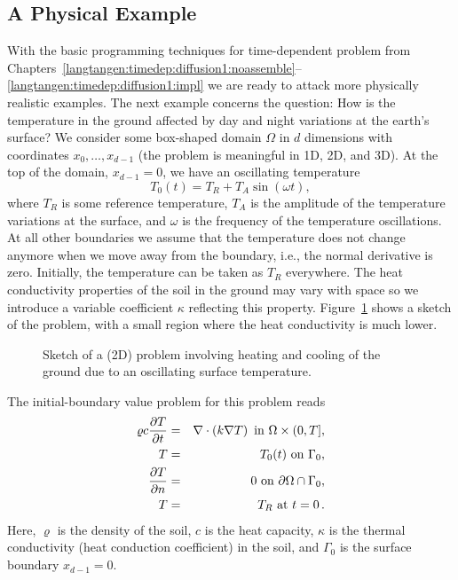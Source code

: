 \subsection{A Physical Example}
\label{langtangen:timedep:diffusion2:sin}

With the basic programming techniques for time-dependent problem from 
Chapters~\ref{langtangen:timedep:diffusion1:noassemble}--\ref{langtangen:timedep:diffusion1:impl}
we are ready to attack more physically realistic examples.
The next example concerns the question: How is the temperature in the
ground affected by day and night variations at the earth's surface?
We consider some box-shaped domain $\Omega$ in $d$ dimensions with
coordinates $x_0,\ldots,x_{d-1}$ (the problem is meaningful in 1D, 2D, and 3D).
At the top of the domain, $x_{d-1}=0$, we have an oscillating
temperature
\[ T_0(t) = T_R + T_A\sin (\omega t),\]
where $T_R$ is some reference temperature, $T_A$ is the amplitude of
the temperature variations at the surface, and $\omega$ is the frequency
of the temperature oscillations.
At all other boundaries we assume
that the temperature does not change anymore when we move away from
the boundary, i.e., the normal derivative is zero.
Initially, the temperature can be taken as $T_R$ everywhere.
The heat conductivity properties of the soil in the 
ground may vary with space so
we introduce a variable coefficient $\kappa$ reflecting this property.
Figure~\ref{langtangen:timedep:diffusion2:sin:fig1} shows a sketch of the
problem, with a small region where the heat conductivity is much lower.
\begin{figure}
\centerline{
  }
  \caption{\label{langtangen:timedep:diffusion2:sin:fig1}
  Sketch of a (2D) problem involving heating and cooling of the ground due
  to an oscillating surface temperature.
  }
\end{figure}

The initial-boundary value problem for this problem reads
\begin{eqnarray}
\varrho c{\partial T\over\partial t} &=& \nabla\cdot\left( k\nabla T\right)\hbox{ in }\Omega\times (0,T],\\
T &=& T_0(t)\hbox{ on }\Gamma_0,\\
{\partial T\over\partial n} &=& 0\hbox{ on }\partial\Omega\cap\Gamma_0,\\
T &=& T_R\hbox{ at }t =0\thinspace .
\end{eqnarray}
Here, $\varrho$ is the density of the soil, $c$ is the
heat capacity, $\kappa$ is the thermal conductivity 
(heat conduction coefficient)
in the soil, and $\Gamma_0$ is the surface boundary $x_{d-1}=0$.

